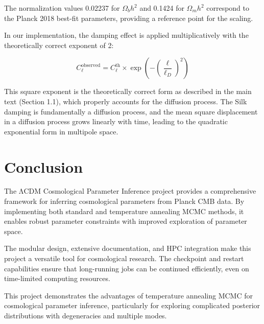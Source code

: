 \documentclass[11pt]{article}
\begin{document}
The normalization values 0.02237 for $\Omega_b h^2$ and 0.1424 for $\Omega_m h^2$ correspond to the Planck 2018 best-fit parameters, providing a reference point for the scaling.

In our implementation, the damping effect is applied multiplicatively with the theoretically correct exponent of 2:

\begin{equation}
C_\ell^{\text{observed}} = C_\ell^{\text{th}} \times \exp\left(-\left(\frac{\ell}{\ell_D}\right)^{2}\right)
\end{equation}

This square exponent is the theoretically correct form as described in the main text (Section 1.1), which properly accounts for the diffusion process. The Silk damping is fundamentally a diffusion process, and the mean square displacement in a diffusion process grows linearly with time, leading to the quadratic exponential form in multipole space.

\section{Conclusion}

The ΛCDM Cosmological Parameter Inference project provides a comprehensive framework for inferring cosmological parameters from Planck CMB data. By implementing both standard and temperature annealing MCMC methods, it enables robust parameter constraints with improved exploration of parameter space.

The modular design, extensive documentation, and HPC integration make this project a versatile tool for cosmological research. The checkpoint and restart capabilities ensure that long-running jobs can be continued efficiently, even on time-limited computing resources.

This project demonstrates the advantages of temperature annealing MCMC for cosmological parameter inference, particularly for exploring complicated posterior distributions with degeneracies and multiple modes.
\end{document}
